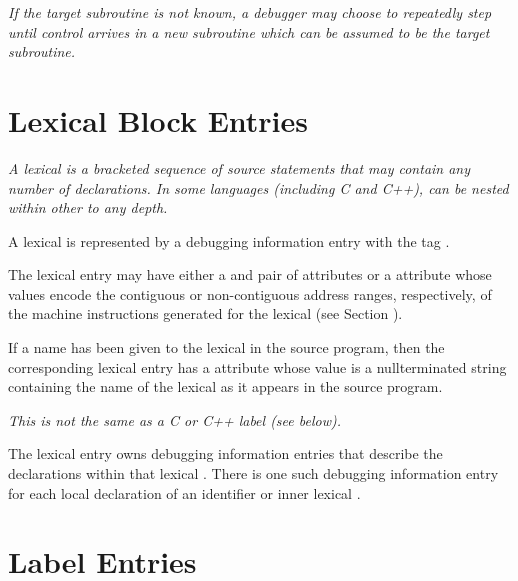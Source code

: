 \textit{If the target subroutine is not known, a debugger may choose
to repeatedly step until control arrives in a new subroutine
which can be assumed to be the target subroutine. }



\section{Lexical Block Entries}
\label{chap:lexicalblockentries}

\textit{A lexical  is a bracketed sequence of source statements
that may contain any number of declarations. In some languages
(including C and C++),  can be nested within other
 to any depth.}

A lexical  is represented by a debugging information
entry with the 
tag .

The lexical  entry
may have 
either a  and
 pair of 
attributes or a  attribute
whose values encode the contiguous or non-contiguous address
ranges, respectively, of the machine instructions generated
for the lexical  
(see Section ).

If a name has been given to the 
lexical  
in the source
program, then the corresponding 
lexical  entry has a
 attribute whose 
value is a null\dash terminated string
containing the name of the lexical  
as it appears in
the source program.

\textit{This is not the same as a C or C++ label (see below).}

The lexical  entry owns 
debugging information entries that
describe the declarations within that lexical . 
There is
one such debugging information entry for each local declaration
of an identifier or inner lexical .

\section{Label Entries}
\label{chap:labelentries}


